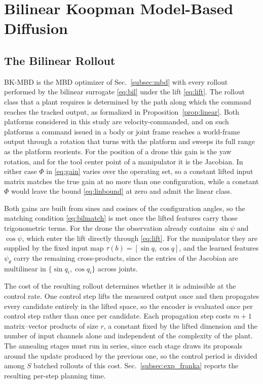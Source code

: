 \documentclass[letterpaper,10pt,conference]{ieeeconf}
\newcommand{\bkmbd}{\textsc{BK-MBD}}
\begin{document}
\section{Bilinear Koopman Model-Based Diffusion}\label{sec:method}

\subsection{The Bilinear Rollout}\label{subsec:rollout}

\bkmbd{} is the MBD optimizer of Sec.~\ref{subsec:mbd} with every rollout performed by the bilinear surrogate \eqref{eq:bil} under the lift \eqref{eq:lift}.
The rollout class that a plant requires is determined by the path along which the command reaches the tracked output, as formalized in Proposition~\ref{prop:linear}.
Both platforms considered in this study are velocity-commanded, and on such platforms a command issued in a body or joint frame reaches a world-frame output through a rotation that turns with the platform and sweeps its full range as the platform reorients.
For the position of a drone this gain is the yaw rotation, and for the tool center point of a manipulator it is the Jacobian.
In either case $\Phi$ in \eqref{eq:gain} varies over the operating set, so a constant lifted input matrix matches the true gain at no more than one configuration, while a constant $\Phi$ would leave the bound \eqref{eq:linbound} at zero and admit the linear class.

Both gains are built from sines and cosines of the configuration angles, so the matching condition \eqref{eq:bilmatch} is met once the lifted features carry those trigonometric terms.
For the drone the observation already contains $\sin\psi$ and $\cos\psi$, which enter the lift directly through \eqref{eq:lift}.
For the manipulator they are supplied by the fixed input map $\tau(b) = [\sin q, \cos q]$, and the learned features $\psi_\theta$ carry the remaining cross-products, since the entries of the Jacobian are multilinear in $\{\sin q_i, \cos q_i\}$ across joints.

The cost of the resulting rollout determines whether it is admissible at the control rate.
One control step lifts the measured output once and then propagates every candidate entirely in the lifted space, so the encoder is evaluated once per control step rather than once per candidate.
Each propagation step costs $m+1$ matrix--vector products of size $r$, a constant fixed by the lifted dimension and the number of input channels alone and independent of the complexity of the plant.
The annealing stages must run in series, since each stage draws its proposals around the update produced by the previous one, so the control period is divided among $S$ batched rollouts of this cost.
Sec.~\ref{subsec:exp_franka} reports the resulting per-step planning time.
\end{document}
